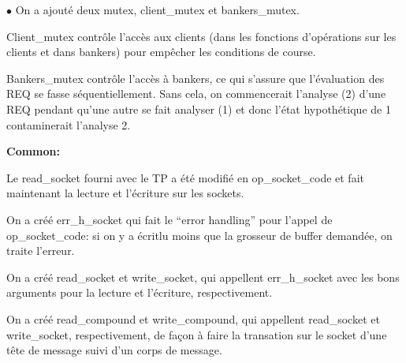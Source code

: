 \documentclass[11pt]{article}
\begin{document}
$\bullet$ On a ajouté deux mutex, client\_mutex et bankers\_mutex.
\begin{description}[font=$\circ$, labelindent=1cm]
 \item Client\_mutex contrôle l’accès aux clients (dans les fonctions d’opérations sur les clients et dans bankers) pour empêcher les conditions de course.
 \item Bankers\_mutex contrôle l’accès à bankers, ce qui s’assure que l’évaluation des REQ se fasse séquentiellement. Sans cela, on commencerait l’analyse (2) d’une REQ pendant qu’une autre se fait analyser (1) et donc l’état hypothétique de 1 contaminerait l’analyse 2.
\end{description}
\textbf{Common:} 
\begin{description}[font=$\bullet$]
 \item Le read\_socket fourni avec le TP a été modifié en op\_socket\_code et fait maintenant la lecture et l’écriture sur les sockets.
 \item On a créé err\_h\_socket qui fait le “error handling” pour l’appel de op\_socket\_code: si on y a écrit\/lu moins que la grosseur de buffer demandée, on traite l’erreur.
 \item On a créé read\_socket et write\_socket, qui appellent err\_h\_socket avec les bons arguments pour la lecture et l’écriture, respectivement.
 \item On a créé read\_compound et write\_compound, qui appellent read\_socket et write\_socket, respectivement, de façon à faire la transation sur le socket d’une tête de message suivi d’un corps de message.\\\\
\end{description}
\end{document}
